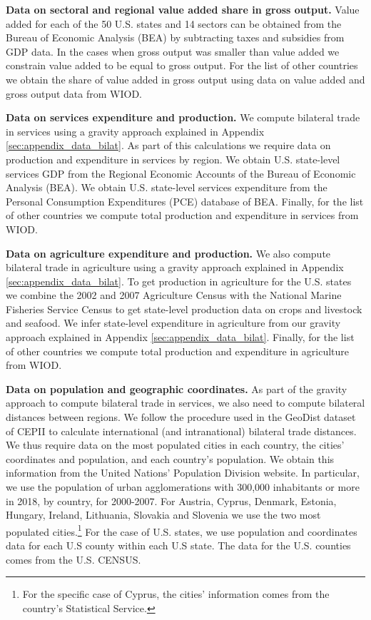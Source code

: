 \documentclass[12pt]{article}
\begin{document}
\textbf{Data on sectoral and regional value added share in gross output.} Value added for each of the 50 U.S. states and 14 sectors can be obtained from the Bureau of Economic Analysis (BEA) by subtracting taxes and subsidies from GDP data. In the cases when gross output was smaller than value added we constrain value added to be equal to gross output. For the list of other countries we obtain the share of value added in gross output using data on value added and gross output data from WIOD.

\textbf{Data on services expenditure and production.} We compute bilateral trade in services using a gravity approach explained in Appendix \ref{sec:appendix_data_bilat}. As part of this calculations we require data on production and expenditure in services by region. We obtain U.S. state-level services GDP from the Regional Economic Accounts of the Bureau of Economic Analysis (BEA). We obtain U.S. state-level services expenditure from the Personal Consumption Expenditures (PCE) database of BEA. Finally, for the list of other countries we compute total production and expenditure in services from WIOD.

\textbf{Data on agriculture expenditure and production.}  We also compute bilateral trade in agriculture using a gravity approach explained in Appendix \ref{sec:appendix_data_bilat}. To get production in agriculture for the U.S. states we combine the 2002 and 2007 Agriculture Census with the National Marine Fisheries Service Census to get state-level production data on crops and livestock and seafood. We infer state-level expenditure in agriculture from our gravity approach explained in Appendix \ref{sec:appendix_data_bilat}. Finally, for the list of other countries we compute total production and expenditure in agriculture from WIOD. 

\textbf{Data on population and geographic coordinates.} As part of the gravity approach to compute bilateral trade in services, we also need to compute bilateral distances between regions. We follow the procedure used in the GeoDist dataset of CEPII to calculate international (and intranational) bilateral trade distances. We thus require data on the most populated cities in each country, the cities' coordinates and population, and each country's population. We obtain this information from the United Nations' Population Division website. In particular, we use the population of urban agglomerations with 300,000 inhabitants or more in 2018, by country, for 2000-2007. For Austria, Cyprus, Denmark, Estonia, Hungary, Ireland, Lithuania, Slovakia and Slovenia we use the two most populated cities.\footnote{For the specific case of Cyprus, the cities' information comes from the country's Statistical Service.} For the case of U.S. states, we use population and coordinates data for each U.S county within each U.S state. The data for the U.S. counties comes from the U.S. CENSUS. 
\end{document}
